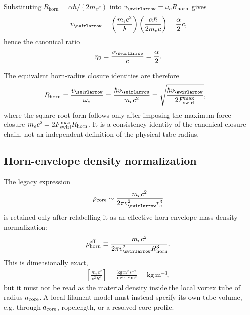             Substituting $R_{\mathrm{horn}} = \alpha\hbar/(2m_e c)$ into
            $v_{\swirlarrow}=\omega_c R_{\mathrm{horn}}$ gives
            \begin{align}
                v_{\swirlarrow}
                =
                \left(\frac{m_e c^2}{\hbar}\right)
                \left(\frac{\alpha \hbar}{2m_e c}\right)
                = \frac{\alpha}{2}c,
            \end{align}
            hence the canonical ratio
            \begin{align}
                \eta_0 = \frac{v_{\swirlarrow}}{c} = \frac{\alpha}{2}.
            \end{align}

            The equivalent horn-radius closure identities are therefore
            \begin{align}
                R_{\mathrm{horn}}
                &=
                \frac{v_{\swirlarrow}}{\omega_c}
                =
                \frac{\hbar v_{\swirlarrow}}{m_e c^2}
                =
                \sqrt{\frac{\hbar v_{\swirlarrow}}{2F_{\rm swirl}^{\max}}},
                \label{eq:canonical_horn_radius_equivalents}
            \end{align}
            where the square-root form follows only after imposing the maximum-force closure $m_e c^2=2F_{\rm swirl}^{\max}R_{\mathrm{horn}}$. It is a consistency identity of the canonical closure chain, not an independent definition of the physical tube radius.

        \subsection{Horn-envelope density normalization}
            The legacy expression
            \begin{align}
                \rho_{\mathrm{core}}
                \sim
                \frac{m_e c^2}{2\pi v_{\swirlarrow}^2 r_c^3}
            \end{align}
            is retained only after relabelling it as an effective horn-envelope mass-density normalization:
            \begin{align}
                \rho_{\mathrm{horn}}^{\rm eff}
                \equiv
                \frac{m_e c^2}{2\pi v_{\swirlarrow}^2 R_{\mathrm{horn}}^3}.
                \label{eq:horn_envelope_density_normalization}
            \end{align}
            This is dimensionally exact,
            \begin{align}
                \left[\frac{m_e c^2}{v^2 R^3}\right]
                =
                \frac{\mathrm{kg\,m^2\,s^{-2}}}{\mathrm{m^2\,s^{-2}}\,\mathrm{m^3}}
                = \mathrm{kg\,m^{-3}},
            \end{align}
            but it must not be read as the material density inside the local vortex tube of radius $a_{\rm core}$. A local filament model must instead specify its own tube volume, e.g. through $a_{\rm core}$, ropelength, or a resolved core profile.

